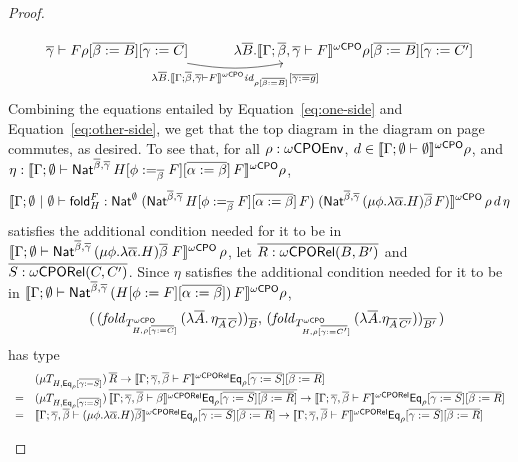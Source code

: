 \documentclass[acmsmall,review,anonymous]{acmart}
\theoremstyle{definition}
\renewcommand{\id}{\mathit{id}}
\begin{document}
\begin{proof}
\begin{itemize}
{\begin{equation}
\begin{tikzcd}[row sep = huge]
{  \ol{\gamma} \vdash F} \rho [\ol{\beta := B}] [\ol{\gamma := C}]
\ar[r, bend right = 10, "{\lambda \ol{B}.\oCPOsem{\Gamma; \ol{\beta}, \ol{\gamma}
      \vdash F} \id_{\rho [\ol{\beta := B}]} [\ol{\gamma := g}]}"'] &
\lambda \ol{B}.\oCPOsem{\Gamma; \ol{\beta}, \ol{\gamma} \vdash F} \rho [\ol{\beta :=
    B}] [\ol{\gamma := C'}]
\end{tikzcd}
\end{equation}}
Combining the equations entailed by Equation~\ref{eq:one-side}
and Equation~\ref{eq:other-side}, we get that
the top diagram in the diagram on
  page~\pageref{page:dia1} commutes, as desired.
To see that, for all $\rho : \omega\mathsf{CPOEnv}$, $d \in
\llbracket{\Gamma; \emptyset \vdash \emptyset}\rrbracket^{{\omega\mathsf{CPO}}}\rho$, and $\eta :
\llbracket{\Gamma; \emptyset \vdash \mathsf{Nat}^{\overline{\beta},
    \overline{\gamma}}\,H[\phi :=_{\overline{\beta}} F][\overline{\alpha := \beta}]\,F}\rrbracket^{{\omega\mathsf{CPO}}}
\rho$,
\[\llbracket{\Gamma; \emptyset~|~\emptyset
  \vdash \mathsf{fold}^F_H : \mathsf{Nat}^\emptyset\;(\mathsf{Nat}^{\overline{\beta},
    \overline{\gamma}}\,H[\phi :=_{\overline{\beta}} F][\overline{\alpha :=
      \beta}]\,F)\; (\mathsf{Nat}^{{\overline{\beta},\overline{\gamma}} }\,(\mu
  \phi.\lambda \overline \alpha.H)\overline \beta\,F)}\rrbracket^{{\omega\mathsf{CPO}}}\,\rho\,d\,\eta\]
satisfies the additional condition needed for it to be in
$\llbracket{\Gamma;\emptyset \vdash \mathsf{Nat}^{{\overline{\beta},\overline{\gamma}}
  }\,(\mu \phi.\lambda \overline \alpha.H)\overline \beta\;F}\rrbracket^{{\omega\mathsf{CPO}}}\,\rho$,
let $\overline{R : {\omega\mathsf{CPORel}}(B,B')}$ and $\overline{S : {\omega\mathsf{CPORel}}(C,C')}$.  Since $\eta$
satisfies the additional condition needed for it to be in
$\llbracket{\Gamma; \emptyset \vdash \mathsf{Nat}^{\overline{\beta},
    \overline{\gamma}}\,(H[\phi := F][\overline{\alpha := \beta}])\,F}\rrbracket^{{\omega\mathsf{CPO}}} \rho$,
\[\begin{array}{ll}
 & (\,(\mathit{fold}_{T^{\omega\mathsf{CPO}}_{H,\rho[\overline{\gamma :=
        C}]}}\,(\lambda \overline{A}.\,\eta_{\overline{A}\,\overline{C}}))_{\overline{B}},\,
(\mathit{fold}_{T^{\omega\mathsf{CPO}}_{H,\rho[\overline{\gamma :=
        C'}]}}\,(\lambda \overline{A}.\eta_{\overline{A}\,\overline{C'}}))_{\overline{B'}}\,) 
\end{array}\]
has type
\[\begin{array}{ll}
  & (\mu T_{H,\mathsf{Eq}_\rho[\overline{\gamma := S}]}) \,\overline{R} \to
\llbracket{\Gamma;\overline{\gamma},\overline{\beta} \vdash F}\rrbracket^{{\omega\mathsf{CPORel}}}\mathsf{Eq}_\rho[\overline{\gamma := 
    S}][\overline{\beta:= R}]\\ 
= & (\mu T_{H,\mathsf{Eq}_\rho[\overline{\gamma :=
      S}]})\,\overline{\llbracket{\Gamma;\overline{\gamma},\overline{\beta} 
  \vdash \beta}\rrbracket^{{\omega\mathsf{CPORel}}}\mathsf{Eq}_\rho[\overline{\gamma := S}][\overline{\beta := R}]} \to
\llbracket{\Gamma;\overline{\gamma},\overline{\beta} \vdash F}\rrbracket^{{\omega\mathsf{CPORel}}}\mathsf{Eq}_\rho[\overline{\gamma := 
    S}][\overline{\beta:= R}]\\ 
= & \llbracket{\Gamma; \overline{\gamma},\overline{\beta} \vdash (\mu \phi. \lambda
  \overline{\alpha}. H)\overline{\beta}}\rrbracket^{{\omega\mathsf{CPORel}}}\mathsf{Eq}_\rho[\overline{\gamma := S}][\overline{\beta := R}] \to
\llbracket{\Gamma;\overline{\gamma},\overline{\beta} \vdash F}\rrbracket^{{\omega\mathsf{CPORel}}}\mathsf{Eq}_\rho[\overline{\gamma := 
    S}][\overline{\beta:= R}]
\qedhere
\end{array}\]


\end{itemize}
\end{proof}
\end{document}
